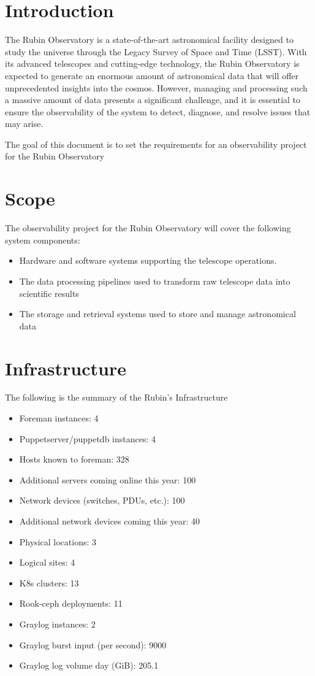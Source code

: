 \section{Introduction}

The Rubin Observatory is a state-of-the-art astronomical facility designed to study the universe through the Legacy Survey of Space and Time (LSST). With its advanced telescopes and cutting-edge technology, the Rubin Observatory is expected to generate an enormous amount of astronomical data that will offer unprecedented insights into the cosmos. However, managing and processing such a massive amount of data presents a significant challenge, and it is essential to ensure the observability of the system to detect, diagnose, and resolve issues that may arise. 

The goal of this document is to set the requirements for an observability project for the Rubin Observatory 

\section{Scope}

The observability project for the Rubin Observatory will cover the following system components:

\begin{itemize}
\item Hardware and software systems supporting the telescope operations.
\item The data processing pipelines used to transform raw telescope data into scientific results
\item The storage and retrieval systems used to store and manage astronomical data
\end{itemize}

\section{Infrastructure}

The following is the summary of the Rubin's Infrastructure

\begin{itemize}
    \item Foreman instances:	4
    \item Puppetserver/puppetdb instances: 4
    \item Hosts known to foreman: 328
    \item Additional servers coming online this year: 100
    \item Network devices (switches, PDUs, etc.): 100
    \item Additional network devices coming this year: 40
    \item Physical locations: 3
    \item Logical sites: 4
    \item K8s clusters: 13
    \item Rook-ceph deployments: 11
    \item Graylog instances: 2
    \item Graylog burst input (per second): 9000
    \item Graylog log volume day (GiB): 205.1
\end{itemize}

